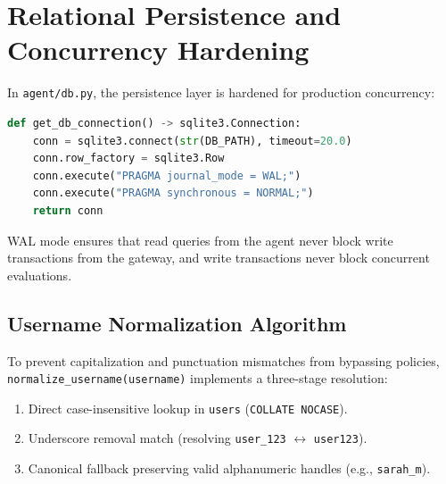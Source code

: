 \section{Relational Persistence and Concurrency Hardening}
\label{sec:impl_db}
In \texttt{agent/db.py}, the persistence layer is hardened for production concurrency:
\begin{lstlisting}[language=Python]
def get_db_connection() -> sqlite3.Connection:
    conn = sqlite3.connect(str(DB_PATH), timeout=20.0)
    conn.row_factory = sqlite3.Row
    conn.execute("PRAGMA journal_mode = WAL;")
    conn.execute("PRAGMA synchronous = NORMAL;")
    return conn
\end{lstlisting}
WAL mode ensures that read queries from the agent never block write transactions from the gateway, and write transactions never block concurrent evaluations.

\subsection{Username Normalization Algorithm}
To prevent capitalization and punctuation mismatches from bypassing policies, \texttt{normalize\_username(username)} implements a three-stage resolution:
\begin{enumerate}
    \item Direct case-insensitive lookup in \texttt{users} (\texttt{COLLATE NOCASE}).
    \item Underscore removal match (resolving \texttt{user\_123} $\leftrightarrow$ \texttt{user123}).
    \item Canonical fallback preserving valid alphanumeric handles (e.g., \texttt{sarah\_m}).
\end{enumerate}

